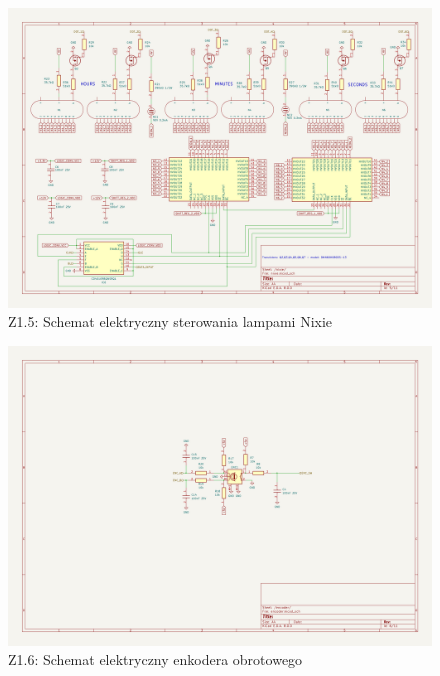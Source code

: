 \documentclass[twoside]{article}
\numberwithin{equation}{section}
\begin{document}
\newpage
\thispagestyle{empty}
\begin{figure}[H]
    \centering
    \includegraphics[width=1.5\textwidth, angle=90]{zalaczniki/5.png}
    \caption*{Z1.5: Schemat elektryczny sterowania lampami Nixie}
\end{figure}

\newpage
\thispagestyle{empty}
\begin{figure}[H]
    \centering
    \includegraphics[width=1.5\textwidth, angle=90]{zalaczniki/6.png}
    \caption*{Z1.6: Schemat elektryczny enkodera obrotowego}
\end{figure}
\end{document}
